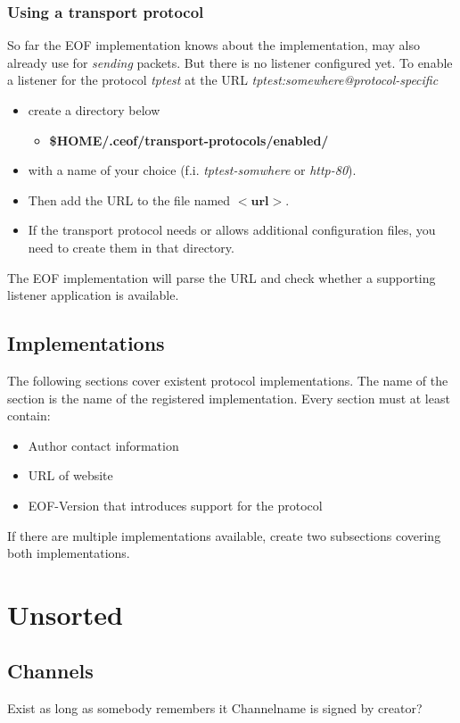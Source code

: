 \documentclass[12pt,a4paper]{book}
\begin{document}
\subsection{Using a transport protocol}
So far the EOF implementation knows about the implementation, may also already
use for \emph{sending} packets. But there is no listener configured yet.
To enable a listener for the protocol \emph{tptest} at the URL
\emph{tptest:somewhere@protocol-specific}
\begin{itemize}
\item create a directory below
\begin{itemize}
\item \textbf{\$HOME/.ceof/transport-protocols/enabled/}
\end{itemize}
\item with a name of your choice (f.i. \emph{tptest-somwhere} or \emph{http-80}).
\item Then add the URL to the file named $<\textbf{url}>$.
\item If the transport protocol needs or allows additional configuration files,
you need to create them in that directory.
\end{itemize}
The EOF implementation will parse the URL and check whether a supporting
listener application is available.
\section{Implementations}
The following sections cover existent protocol implementations.
The name of the section is the name of the registered implementation.
Every section must at least contain:
\begin{itemize}
\item Author contact information
\item URL of website
\item EOF-Version that introduces support for the protocol
\end{itemize}

If there are multiple implementations available, create two subsections
covering both implementations.
\chapter{Unsorted}
\section{Channels}
Exist as long as somebody remembers it
Channelname is signed by creator?
\appendix
\end{document}
